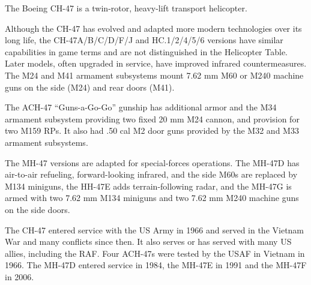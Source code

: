 


The Boeing CH-47 is a twin-rotor, heavy-lift transport helicopter.

Although the CH-47 has evolved and adapted more modern technologies over its long life, the CH-47A/B/C/D/F/J and HC.1/2/4/5/6 versions have similar capabilities in game terms and are not distinguished in the Helicopter Table. Later models, often upgraded in service, have improved infrared countermeasures. The M24 and M41 armament subsystems mount 7.62 mm M60 or M240 machine guns on the side (M24) and rear doors (M41).

The ACH-47 “Guns-a-Go-Go” gunship has additional armor and the M34 armament subsystem providing two fixed 20 mm M24 cannon, and provision for two M159  RPs. It also had .50 cal M2 door guns provided by the M32 and M33 armament subsystems.

The MH-47 versions are adapted for special-forces operations. The MH-47D has air-to-air refueling, forward-looking infrared, and the side M60s are replaced by M134 miniguns, the HH-47E adds terrain-following radar, and the MH-47G is armed with two 7.62 mm M134 miniguns and two 7.62 mm M240 machine guns on the side doors.

The CH-47 entered service with the US Army in 1966 and served in the Vietnam War and many conflicts since then. It also serves or has served with many US allies, including the RAF. Four ACH-47s were tested by the USAF in Vietnam in 1966. The MH-47D entered service in 1984, the MH-47E in 1991 and the MH-47F in 2006.
